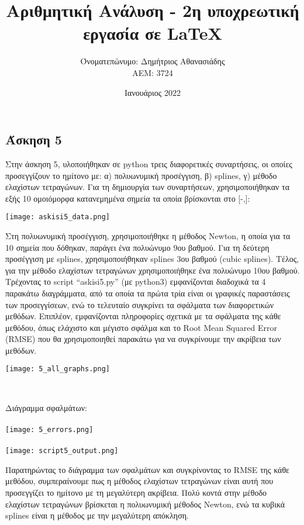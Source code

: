 \documentclass{article}
\title{Αριθμητική Ανάλυση - 2η υποχρεωτική εργασία σε \textlatin {\LaTeX}} %
\author{Όνοματεπώνυμο: Δημήτριος Αθανασιάδης  \\  ΑΕΜ: 3724}       %
\date{Ιανουάριος 2022}
\begin{document}
\maketitle

\begin{center}
\section*{Άσκηση 5}
\end{center}

Στην άσκηση 5, υλοποιήθηκαν σε \textlatin{python} τρεις διαφορετικές συναρτήσεις, οι οποίες προσεγγίζουν το ημίτονο με: α) πολυωνυμική προσέγγιση, β) \textlatin{splines}, γ) μέθοδο ελαχίστων τετραγώνων. Για τη δημιουργία των συναρτήσεων, χρησιμοποιήθηκαν τα εξής 10 ομοιόμορφα κατανεμημένα σημεία τα οποία βρίσκονται στο [-\pi,\pi]: \\

\begin{center}
    \texttt{[image: askisi5\_data.png]} 
\end{center}

Στη πολυωνυμική προσέγγιση, χρησιμοποιήθηκε η μέθοδος \textlatin{Newton}, η οποία για τα 10 σημεία που δόθηκαν, παράγει ένα πολυώνυμο 9ου βαθμού. Για τη δεύτερη προσέγγιση με \textlatin{splines}, χρησιμοποιήθηκαν \textlatin{splines} 3ου βαθμού (\textlatin{cubic splines}). Τέλος, για την μέθοδο ελαχίστων τετραγώνων χρησιμοποιήθηκε ένα πολυώνυμο 10ου βαθμού. \\

Τρέχοντας το \textlatin{script “askisi5.py”} (με \textlatin{python3}) εμφανίζονται διαδοχικά τα 4 παρακάτω διαγράμματα, από τα οποία τα πρώτα τρία είναι οι γραφικές παραστάσεις των προσεγγίσεων, ενώ το τελευταίο συγκρίνει τα σφάλματα των διαφορετικών μεθόδων. Επιπλέον, εμφανίζονται πληροφορίες σχετικά με τα σφάλματα της κάθε μεθόδου, όπως ελάχιστο και μέγιστο σφάλμα και το \textlatin{Root Mean Squared Error (RMSE)} που θα χρησιμοποιηθεί παρακάτω για να συγκρίνουμε την ακρίβεια των μεθόδων. 
\pagebreak
\begin{center}
    \texttt{[image: 5\_all\_graphs.png]}
    \thispagestyle{empty}
\end{center}
\pagebreak \\
\begin{center}
    Διάγραμμα σφαλμάτων: \\~\\
    \texttt{[image: 5\_errors.png]} \\~\\
    \texttt{[image: script5\_output.png]}
\end{center}
\pagebreak 
Παρατηρώντας το διάγραμμα των σφαλμάτων και συγκρίνοντας το \textlatin{RMSE} της κάθε μεθόδου, συμπεραίνουμε πως η μέθοδος ελαχίστων τετραγώνων είναι αυτή που προσεγγίζει το ημίτονο με τη μεγαλύτερη ακρίβεια. Πολύ κοντά στην μέθοδο ελαχίστων τετραγώνων βρίσκεται η πολυωνυμική μέθοδος \textlatin{Newton}, ενώ τα κυβικά \textlatin{splines} είναι η μέθοδος με την μεγαλύτερη απόκληση.
\end{document}
